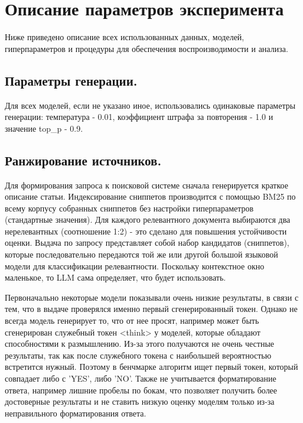 \documentclass{article}
\theoremstyle{definition}
\theoremstyle{plain}
\begin{document}
\section*{Описание параметров эксперимента}
Ниже приведено описание всех использованных данных, моделей, гиперпараметров и процедуры для обеспечения воспроизводимости и анализа.

\subsection*{Параметры генерации.}
Для всех моделей, если не указано иное, использовались одинаковые параметры генерации: температура - 0.01, коэффициент штрафа за повторения - 1.0 и значение top\_p - 0.9.

\subsection*{Ранжирование источников.}
Для формирования запроса к поисковой системе сначала генерируется краткое описание статьи. 
Индексирование сниппетов производится с помощью BM25 по всему корпусу собранных сниппетов без настройки гиперпараметров (стандартные значения).
Для каждого релевантного документа выбираются два нерелевантных (соотношение 1:2) - это сделано для повышения устойчивости оценки.
Выдача по запросу представляет собой набор кандидатов (сниппетов), которые последовательно передаются той же или другой большой языковой модели для классификации релевантности.
Поскольку контекстное окно маленькое, то LLM сама определяет, что будет использовать.

Первоначально некоторые модели показывали очень низкие результаты, в связи с тем, что в выдаче проверялся именно первый сгенерированный токен. Однако не всегда модель генерирует то, что от нее просят, например может быть сгенерирован служебный
токен <think> у моделей, которые обладают способностями к размышлению. Из-за этого получаются не очень честные результаты, так как после служебного токена с наибольшей вероятностью встретится нужный. Поэтому в бенчмарке алгоритм ищет первый токен,
который совпадает либо с 'YES', либо 'NO'. Также не учитывается форматирование ответа, например лишние пробелы по бокам, что позволяет получить более достоверные результаты и не ставить низкую оценку моделям только из-за неправильного форматирования ответа.
\end{document}
